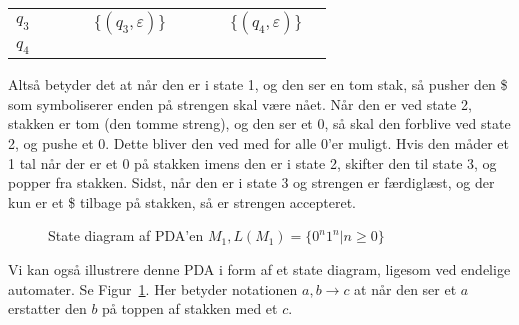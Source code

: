 \begin{example}[$\{0^{n}1^{n} | n \ge 0\}$]
\begin{enumerate}
\begin{center}
\begin{table}[ht]
\begin{tabular}{l|lllllllll}
$q_3$                                                                   &                        &                         &                                    & $\{(q_3, \varepsilon)\}$ &                         &                                    &                        & $\{(q_4, \varepsilon)\}$ &                                    \\ \cline{1-1}
$q_4$                                                                   &                        &                         &                                    &                          &                         &                                    &                        &                          &                                    \\ \cline{1-1}
\end{tabular}
\end{table}
          \end{center}
  \end{enumerate}
          Altså betyder det at når den er i state 1, og den ser en tom stak, så pusher den \$ som symboliserer enden på strengen skal være nået. Når den er ved state 2, stakken er tom (den tomme streng), og den ser et 0, så skal den forblive ved state 2, og pushe et 0. Dette bliver den ved med for alle 0'er muligt. Hvis den måder et 1 tal når der er et 0 på stakken imens den er i state 2, skifter den til state 3, og popper fra stakken. Sidst, når den er i state 3 og strengen er færdiglæst, og der kun er et \$ tilbage på stakken, så er strengen accepteret.


          \begin{figure}[ht]
            \centering
            \caption{\label{fig:sipser2.15} State diagram af PDA'en $M_1, L(M_1) = \{0^n 1^n  | n \ge 0 \}$}
          \end{figure}


          Vi kan også illustrere denne PDA i form af et state diagram, ligesom ved endelige automater. Se Figur~\ref{fig:sipser2.15}. Her betyder notationen $a, b \rightarrow c$ at når den ser et $a$ erstatter den $b$ på toppen af stakken med et $c$.

\end{example}


